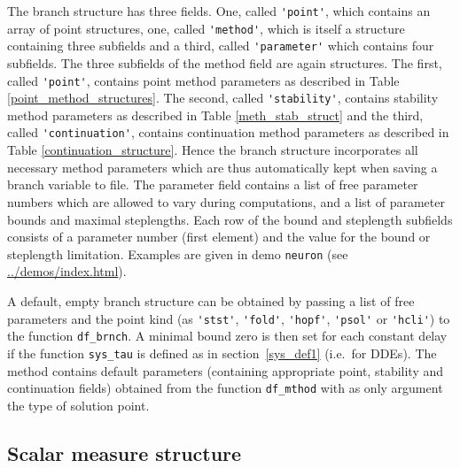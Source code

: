 \documentclass[10pt]{scrartcl}
\newcommand{\demobase}{\url{../demos/index.html}}
\newcommand{\blist}[1]{\mbox{\lstinline!#1!}}
\begin{document}
The branch structure has three fields. One, called \blist{'point'},
which contains an array of point structures, one, called
\blist{'method'}, which is itself a structure containing three
subfields and a third, called \blist{'parameter'} which contains four
subfields.  The three subfields of the method field are again
structures. The first, called \blist{'point'}, contains point method
parameters as described in Table \ref{point_method_structures}.  The
second, called \blist{'stability'}, contains stability method
parameters as described in Table \ref{meth_stab_struct} and the third,
called \blist{'continuation'}, contains continuation method parameters
as described in Table \ref{continuation_structure}.  Hence the branch
structure incorporates all necessary method parameters which are thus
automatically kept when saving a branch variable to file.  The
parameter field contains a list of free parameter numbers which are
allowed to vary during computations, and a list of parameter bounds
and maximal steplengths. Each row of the bound and steplength
subfields consists of a parameter number (first element) and the value
for the bound or steplength limitation. Examples are given in demo
\texttt{neuron} (see \demobase{}).

A default, empty branch structure can be obtained by passing
a list of free parameters and the point kind 
(as \blist{'stst'}, \blist{'fold'}, \blist{'hopf'}, \blist{'psol'}
or \blist{'hcli'})
to the function \blist{df_brnch}. A minimal bound zero is then set
for each constant delay if the function \blist{sys_tau} is defined
as in section~\ref{sys_def1} (i.e.~for DDEs). The method contains 
default parameters
(containing appropriate point, stability and continuation fields)
obtained from the function \blist{df_mthod} with as only argument the type
of solution point.


\subsection{Scalar measure structure}\label{sec:meas:struct}
\end{document}
